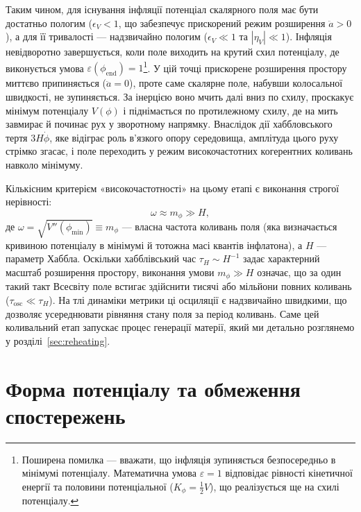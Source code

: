 Таким чином, для існування інфляції потенціал скалярного поля має бути достатньо пологим ($\epsilon_V < 1$, що забезпечує прискорений режим розширення $\ddot{a} > 0$), а для її тривалості --- надзвичайно пологим ($\epsilon_V \ll 1$ та $|\eta_V| \ll 1$). Інфляція невідворотно завершується, коли поле виходить на крутий схил потенціалу, де виконується умова $\varepsilon(\phi_{\mathrm{end}}) = 1$\footnote{Поширена помилка --- вважати, що інфляція зупиняється безпосередньо в мінімумі потенціалу. Математична умова $\varepsilon = 1$ відповідає рівності кінетичної енергії та половини потенціальної ($K_\phi = \frac{1}{2}V$), що реалізується ще на схилі потенціалу.}. У цій точці прискорене розширення простору миттєво припиняється ($\ddot{a}=0$), проте саме скалярне поле, набувши колосальної швидкості, не зупиняється. За інерцією воно мчить далі вниз по схилу, проскакує мінімум потенціалу $V(\phi)$ і піднімається по протилежному схилу, де на мить завмирає й починає рух у зворотному напрямку. Внаслідок дії хаббловського тертя $3H\dot{\phi}$, яке відіграє роль в'язкого опору середовища, амплітуда цього руху стрімко згасає, і поле переходить у режим високочастотних когерентних коливань навколо мінімуму.

Кількісним критерієм «високочастотності» на цьому етапі є виконання строгої нерівності:
\begin{equation*}
    \omega \approx m_\phi \gg H,
\end{equation*}
де $\omega = \sqrt{V''(\phi_{\mathrm{min}})} \equiv m_\phi$ --- власна частота коливань поля (яка визначається кривиною потенціалу в мінімумі й тотожна масі квантів інфлатона), а $H$ --- параметр Хаббла. Оскільки хабблівський час $\tau_H \sim H^{-1}$ задає характерний масштаб розширення простору, виконання умови $m_\phi \gg H$ означає, що за один такий такт Всесвіту поле встигає здійснити тисячі або мільйони повних коливань ($\tau_{\mathrm{osc}} \ll \tau_H$). На тлі динаміки метрики ці осциляції є надзвичайно швидкими, що дозволяє усереднювати рівняння стану поля за період коливань. Саме цей коливальний етап запускає процес генерації матерії, який ми детально розглянемо у розділі~\ref{sec:reheating}.

\section{Форма потенціалу та обмеження спостережень}

